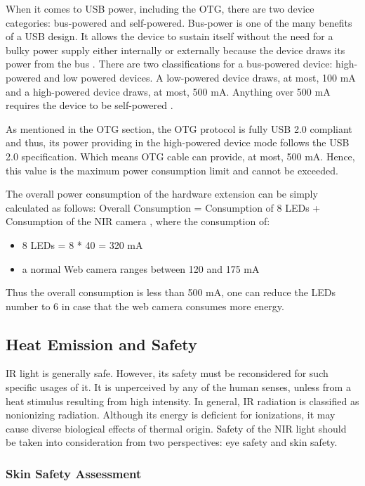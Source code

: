 When it comes to USB power, including the OTG, there are two device categories: bus-powered and self-powered. Bus-power is one of the many benefits of a USB design. It allows the device to sustain itself without the need for a bulky power supply either internally or externally because the device draws its power from the bus \parencite{usb}.
There are two classifications for a bus-powered device: high-powered and low powered devices. A low-powered device draws, at most, 100 mA and a high-powered device draws, at most, 500 mA. Anything over 500 mA requires the device to be self-powered \parencite{usb}.

As mentioned in the OTG section, the OTG protocol is fully USB 2.0 compliant and thus, its power providing in the high-powered device mode follows the USB 2.0 specification. Which means OTG cable can provide, at most, 500 mA. Hence, this value is the maximum power consumption limit and cannot be exceeded.

The overall power consumption of the hardware extension can be simply calculated as follows:	Overall Consumption = Consumption of 8 LEDs + Consumption of the NIR camera
	, where the consumption of:
\begin{itemize}
	  \item 8 LEDs = 8 * 40 = 320 mA
	  \item a normal Web camera ranges between 120 and 175 mA
\end{itemize}
Thus the overall consumption is less than 500 mA, one can reduce the LEDs number to 6 in case that the web camera consumes more energy.


\subsection{Heat Emission and Safety}
IR light is generally safe. However, its safety must be reconsidered for such specific usages of it. It is unperceived by any of the human senses, unless from a heat stimulus resulting from high intensity.
In general, IR radiation is classified as nonionizing radiation. Although its energy is deficient for ionizations, it may cause diverse biological effects of thermal origin\parencite{ledEyeSafety}.
Safety of the NIR light should be taken into consideration from two perspectives: eye safety and skin safety.

\subsubsection {Skin Safety Assessment}

